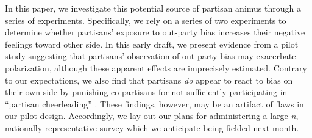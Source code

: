 \documentclass[12pt, letterpaper]{article}
\begin{document}
In this paper, we investigate this potential source of partisan animus through a series of experiments. Specifically, we rely on a series of two experiments to determine whether partisans' exposure to out-party bias increases their negative feelings toward other side. In this early draft, we present evidence from a pilot study suggesting that partisans' observation of out-party bias may exacerbate polarization, although these apparent effects are imprecisely estimated. Contrary to our expectations, we also find that partisans \textit{do} appear to react to bias on their own side by punishing co-partisans for not sufficiently participating in ``partisan cheerleading'' \citep{bullocketal_2015}. These findings, however, may be an artifact of flaws in our pilot design. Accordingly, we lay out our plans for administering a large-\textit{n}, nationally representative survey which we anticipate being fielded next month. %


\end{document}
